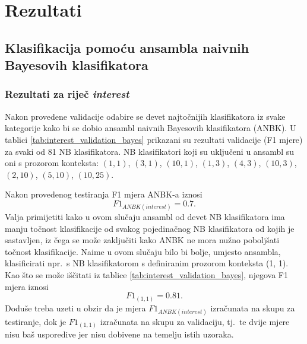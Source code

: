 \documentclass[10pt, a4paper]{article}
\begin{document}
\section{Rezultati}
\subsection{Klasifikacija pomoću ansambla naivnih Bayesovih klasifikatora}
\subsubsection{Rezultati za riječ \emph{interest}} 
Nakon provedene validacije odabire se devet najtočnijih klasifikatora iz
svake kategorije kako bi se dobio ansambl naivnih Bayesovih klasifikatora (ANBK). 
U tablici \ref{tab:interest_validation_bayes} prikazani su rezultati
validacije (F1 mjere) za svaki od 81 NB klasifikatora. 
NB klasifikatori koji su uključeni u ansambl su oni
s prozorom konteksta: $(1,1)$, $(3,1)$, $(10,1)$,
$(1,3)$, $(4,3)$, $(10,3)$, $(2,10)$, $(5,10)$, $(10,25)$.

Nakon provedenog testiranja F1 mjera ANBK-a iznosi
\begin{equation}
\label{eq:F1_ansambl}
F1_{ANBK(interest)} = 0.7.
\end{equation}
Valja primijetiti kako u ovom
slučaju ansambl od devet NB klasifikatora ima manju točnost klasifikacije
od svakog pojedinačnog NB klasifikatora od kojih je sastavljen,
iz čega se može zaključiti kako ANBK ne mora nužno poboljšati
točnost klasifikacije. Naime u ovom slučaju bilo bi bolje, umjesto ansambla, klasificirati
npr.~s NB klasifikatorom s definiranim prozorom konteksta (1, 1). Kao
što se može iščitati iz tablice \ref{tab:interest_validation_bayes}, njegova F1 mjera iznosi
\begin{equation}
\label{eq:F1_1_1}
F1_{(1,1)} = 0.81.
\end{equation}
Doduše treba uzeti u obzir da je mjera $F1_{ANBK(interest)}$ izračunata na skupu za testiranje,
dok je $F1_{(1,1)}$ izračunata na skupu za validaciju, tj.~te dvije mjere nisu
baš usporedive jer nisu dobivene na temelju istih uzoraka.
\end{document}
